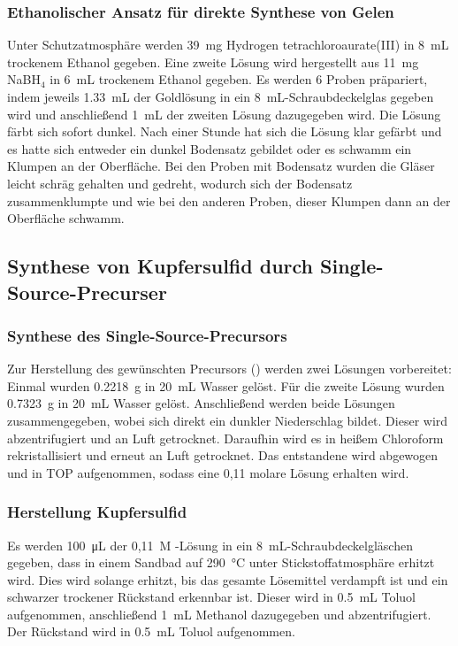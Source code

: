 		
	\subsubsection{Ethanolischer Ansatz für direkte Synthese von Gelen}
		Unter Schutzatmosphäre werden \SI{39}{\milli\gram} Hydrogen tetrachloroaurate(III) in \SI{8}{\milli\liter} trockenem Ethanol gegeben.
		Eine zweite Lösung wird hergestellt aus \SI{11}{\milli\gram} NaBH$_4$ in \SI{6}{\milli\liter} trockenem Ethanol gegeben.
		Es werden 6 Proben präpariert, indem jeweils \SI{1,33}{\milli\liter} der Goldlösung in ein \SI{8}{\milli\liter}-Schraubdeckelglas gegeben wird und anschließend \SI{1}{\milli\liter} der zweiten Lösung dazugegeben wird.
		Die Lösung färbt sich sofort dunkel.
		Nach einer Stunde hat sich die Lösung klar gefärbt und es hatte sich entweder ein dunkel Bodensatz gebildet oder es schwamm ein Klumpen an der Oberfläche.
		Bei den Proben mit Bodensatz wurden die Gläser leicht schräg gehalten und gedreht, wodurch sich der Bodensatz zusammenklumpte und wie bei den anderen Proben, dieser Klumpen dann an der Oberfläche schwamm.  
		
	\subsection{Synthese von Kupfersulfid durch Single-Source-Precurser}
		\subsubsection{Synthese des Single-Source-Precursors }
	        Zur Herstellung des gewünschten Precursors () werden zwei Lösungen vorbereitet: 
    	    Einmal wurden \SI{0,2218}{\gram}  in \SI{20}{\milli\liter} Wasser gelöst.
	        Für die zweite Lösung wurden \SI{0,7323}{\gram}  in \SI{20}{\milli\liter} Wasser gelöst.
	        Anschließend werden beide Lösungen zusammengegeben, wobei sich direkt ein dunkler Niederschlag bildet.
	        Dieser wird abzentrifugiert und an Luft getrocknet.
	        Daraufhin wird es in heißem Chloroform rekristallisiert und erneut an Luft getrocknet.
		    Das entstandene  wird abgewogen und in TOP aufgenommen, sodass eine 0,11 molare Lösung erhalten wird.
		    
		\subsubsection{Herstellung Kupfersulfid}
		    Es werden \SI{100}{\micro\liter} der 0,11~M -Lösung in ein \SI{8}{\milli\liter}-Schraubdeckelgläschen gegeben, dass in einem Sandbad auf \SI{290}{\degreeCelsius} unter Stickstoffatmosphäre erhitzt wird.
		    Dies wird solange erhitzt, bis das gesamte Lösemittel verdampft ist und ein schwarzer trockener Rückstand erkennbar ist.
		    Dieser wird in \SI{0,5}{\milli\liter} Toluol aufgenommen, anschließend \SI{1}{\milli\liter} Methanol dazugegeben und abzentrifugiert.
		    Der Rückstand wird in \SI{0,5}{\milli\liter} Toluol aufgenommen.
	
